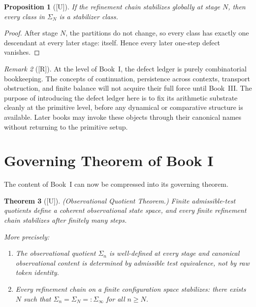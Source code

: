 \documentclass[12pt,oneside]{amsbook}
\theoremstyle{plain}
\newtheorem{theorem}{Theorem}[section]
\newtheorem{proposition}[theorem]{Proposition}
\theoremstyle{definition}
\theoremstyle{remark}
\newtheorem{remark}[theorem]{Remark}
\newcommand{\status}[1]{\textup{[#1]}}
\begin{document}
\begin{proposition}[\status{U}]\label{prop:stabilizer-after-stab}
If the refinement chain stabilizes globally at stage $N$, then every
class in $\Sigma_N$ is a stabilizer class.
\end{proposition}

\begin{proof}
After stage $N$, the partitions do not change, so every class has
exactly one descendant at every later stage: itself.  Hence every
later one-step defect vanishes.
\end{proof}

\begin{remark}[\status{R}]\label{rmk:defect-pre-transport}
At the level of Book~I, the defect ledger is purely combinatorial
bookkeeping.  The concepts of continuation, persistence across
contexts, transport obstruction, and finite balance will not acquire
their full force until Book~III.  The purpose of introducing the
defect ledger here is to fix its arithmetic substrate cleanly at the
primitive level, before any dynamical or comparative structure is
available.  Later books may invoke these objects through their
canonical names without returning to the primitive setup.
\end{remark}

\section{Governing Theorem of Book I}

The content of Book~I can now be compressed into its governing theorem.

\begin{theorem}[\status{U}]\label{thm:governing}
\textup{(Observational Quotient Theorem.)}  Finite admissible-test
quotients define a coherent observational state space, and every
finite refinement chain stabilizes after finitely many steps.

More precisely:
\begin{enumerate}[label=\textup{(\alph*)}]
  \item\label{thm:gov-a} The observational quotient $\Sigma_n$ is
        well-defined at every stage and canonical observational content
        is determined by admissible test equivalence, not by raw token
        identity.
  \item\label{thm:gov-b} Every refinement chain on a finite
        configuration space stabilizes: there exists $N$ such that
        $\Sigma_n = \Sigma_N =: \Sigma_\infty$ for all $n \geq N$.
\end{enumerate}
\end{theorem}
\end{document}
